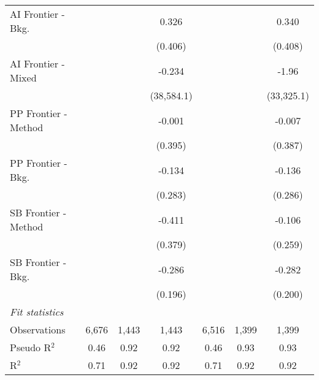 \begin{tabular}{lcccccc}
   AI Frontier - Bkg.   &               &               & 0.326         &               &               & 0.340\\   
                        &               &               & (0.406)       &               &               & (0.408)\\   
   AI Frontier - Mixed  &               &               & -0.234        &               &               & -1.96\\   
                        &               &               & (38,584.1)    &               &               & (33,325.1)\\   
   PP Frontier - Method &               &               & -0.001        &               &               & -0.007\\   
                        &               &               & (0.395)       &               &               & (0.387)\\   
   PP Frontier - Bkg.   &               &               & -0.134        &               &               & -0.136\\   
                        &               &               & (0.283)       &               &               & (0.286)\\   
   SB Frontier - Method &               &               & -0.411        &               &               & -0.106\\   
                        &               &               & (0.379)       &               &               & (0.259)\\   
   SB Frontier - Bkg.   &               &               & -0.286        &               &               & -0.282\\   
                        &               &               & (0.196)       &               &               & (0.200)\\   
   \midrule
   \emph{Fit statistics}\\
   Observations         & 6,676         & 1,443         & 1,443         & 6,516         & 1,399         & 1,399\\  
   Pseudo R$^2$         & 0.46          & 0.92          & 0.92          & 0.46          & 0.93          & 0.93\\  
   R$^2$                & 0.71          & 0.92          & 0.92          & 0.71          & 0.92          & 0.92\\  
   

\end{tabular}
